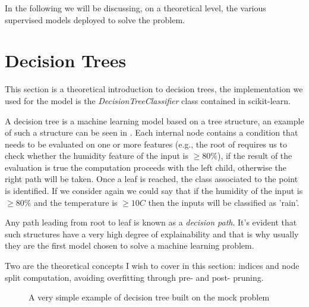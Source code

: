 \medskip

In the following we will be discussing, on a theoretical level, the various supervised models deployed
to solve the problem.

\section{Decision Trees}
\label{sec:dt}
This section is a theoretical introduction to decision trees, the implementation we used for the
model is the \emph{DecisionTreeClassifier} class contained in scikit-learn.

\medskip

A decision tree is a machine learning model based on a tree structure, an example of such a
structure can be seen in . Each internal node contains a condition that needs to
be evaluated on one or more features (e.g.,  the root of  requires us to check
whether the humidity feature of the input is $\geq 80\%$), if the result of the evaluation is true
the computation proceeds with the left child, otherwise the right path will be taken. Once a leaf is
reached, the class associated to the point is identified. If we consider again 
we could say that if the humidity of the input is $\geq 80\%$ and the temperature is $\geq 10C$ then
the inputs will be classified as 'rain'.

Any path leading from root to leaf is known as a \emph{decision path}. It's evident that such structures have a very high degree of explainability and that is why usually they are the first model chosen to solve a machine learning problem.

\medskip

Two are the theoretical concepts I wish to cover in this section: indices and node split
computation, avoiding overfitting through pre- and post- pruning.
\begin{figure}
	\centering
	\caption{A very simple example of decision tree built on the mock problem}
	\label{fig:simple-dt}
\end{figure}
